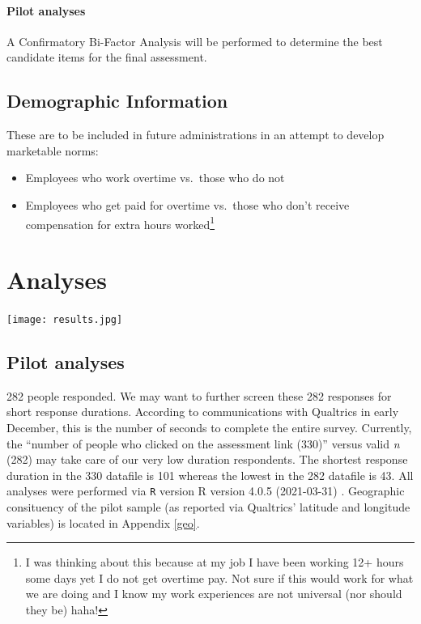 \documentclass[
]{book}
\providecommand{\tightlist}{%
  \setlength{\itemsep}{0pt}\setlength{\parskip}{0pt}}
\begin{document}
\hypertarget{pilot-analyses}{%
\subsubsection{Pilot analyses}\label{pilot-analyses}}

A Confirmatory Bi-Factor Analysis will be performed to determine the best candidate items for the final assessment.

\hypertarget{demographic-information}{%
\section{Demographic Information}\label{demographic-information}}

These are to be included in future administrations in an attempt to develop marketable norms:

\begin{itemize}
\tightlist
\item
  Employees who work overtime vs.~those who do not
\item
  Employees who get paid for overtime vs.~those who don't receive compensation for extra hours worked\footnote{I was thinking about this because at my job I have been working 12+ hours some days yet I do not get overtime pay. Not sure if this would work for what we are doing and I know my work experiences are not universal (nor should they be) haha!}
\end{itemize}

\hypertarget{analyses}{%
\chapter{Analyses}\label{analyses}}

\texttt{[image: results.jpg]}

\hypertarget{pilot-analyses-1}{%
\section{Pilot analyses}\label{pilot-analyses-1}}

282 people responded. We may want to further screen these 282 responses for short response durations. According to communications with Qualtrics in early December, this is the number of seconds to complete the entire survey. Currently, the ``number of people who clicked on the assessment link (330)'' versus valid \emph{n} (282) may take care of our very low duration respondents. The shortest response duration in the 330 datafile is 101 whereas the lowest in the 282 datafile is 43. All analyses were performed via \texttt{R} version R version 4.0.5 (2021-03-31) \citep{R-base}. Geographic consituency of the pilot sample (as reported via Qualtrics' latitude and longitude variables) is located in Appendix \ref{geo}.
\end{document}
